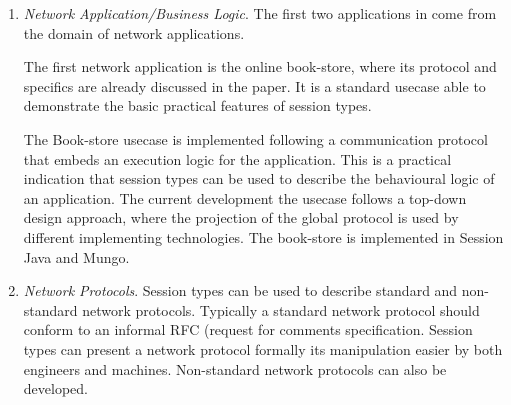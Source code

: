\begin{enumerate}
	\item	{\em Network Application/Business Logic}.
			The first two applications in 
			come from the domain of network applications.

			The first network application is the online book-store,
			where its protocol and specifics are already discussed
			in the paper. It is a standard usecase able to demonstrate
			the basic practical features of session types.

			The Book-store usecase is implemented following a
			communication protocol that embeds an execution logic
			for the application. This is a practical indication
			that session types can be used to describe the
			behavioural logic of an application.
			The current development the usecase follows a
			top-down design approach, where the projection
			of the global protocol is used by different
			implementing technologies.
			The book-store is implemented in Session Java and Mungo.


		


	
	\item	{\em Network Protocols}.
	Session types can be used to describe standard and non-standard network protocols.
	Typically a standard network protocol should conform to
	an informal RFC (request for comments specification. Session types
	can present a network protocol formally its manipulation easier
	by both engineers and machines.
	Non-standard network protocols can also be developed.



\end{enumerate}
